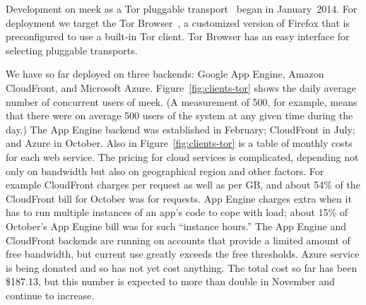 \documentclass{sig-alternate}
\newcommand{\meek}{meek\xspace}
\begin{document}
Development on \meek as a Tor pluggable transport~\cite{pt} began in January~2014.
For deployment we target
the Tor Browser~\cite{torbrowser},
a customized version of Firefox that is
preconfigured to use a built-in Tor client.
Tor Browser has an easy interface for selecting pluggable transports.

We have so far deployed on three backends:
Google App Engine,
Amazon CloudFront,
and Microsoft Azure.
Figure~\ref{fig:clients-tor} shows the daily average number of concurrent users of \meek.
(A measurement of 500, for example, means that there were on average 500
users of the system at any given time during the day.)
The App Engine backend was established in February;
CloudFront in July;
and Azure in October.
Also in Figure~\ref{fig:clients-tor} is a table of monthly costs for each web service.
The pricing for cloud services is complicated,
depending not only on bandwidth but also on geographical region and other factors.
For example CloudFront charges per request as well as per GB,
and about 54\% of the CloudFront bill for October was for requests.
App Engine charges extra when it has to run multiple instances
of an app's code to cope with load;
about 15\% of October's App Engine bill was for such ``instance hours.''
The App Engine and CloudFront backends are running on accounts
that provide a limited amount of free bandwidth,
but current use greatly exceeds the free thresholds.
Azure service is being donated and so has not yet cost anything.
The total cost so far has been \$187.13,
but this number is expected to more than double in November and continue to increase.
\end{document}
